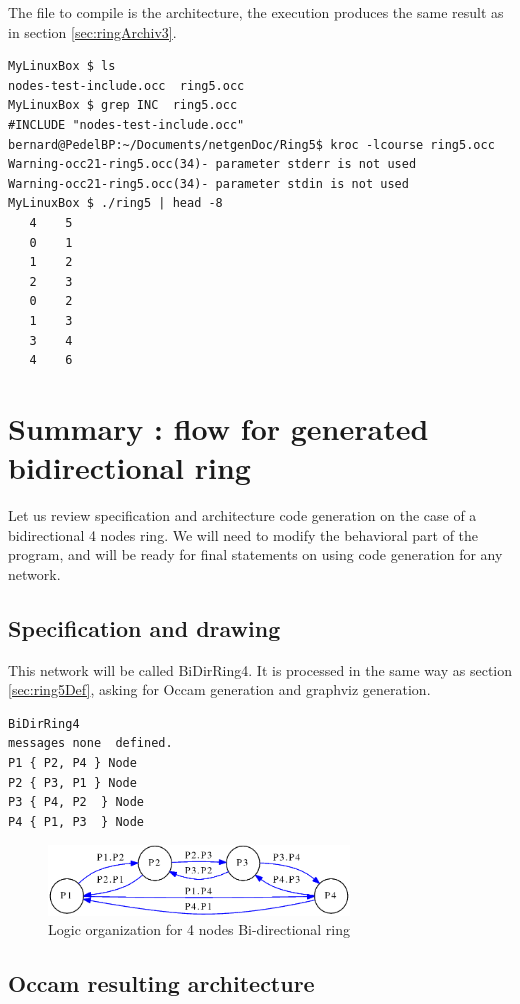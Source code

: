 \documentclass[times,a4paper]{book}
\begin{document}
The file to compile is the architecture, the execution produces the same result as in section 
\ref{sec:ringArchiv3}.

\begin{lstlisting} 
MyLinuxBox $ ls
nodes-test-include.occ  ring5.occ
MyLinuxBox $ grep INC  ring5.occ
#INCLUDE "nodes-test-include.occ"
bernard@PedelBP:~/Documents/netgenDoc/Ring5$ kroc -lcourse ring5.occ
Warning-occ21-ring5.occ(34)- parameter stderr is not used
Warning-occ21-ring5.occ(34)- parameter stdin is not used
MyLinuxBox $ ./ring5 | head -8
   4    5
   0    1
   1    2
   2    3
   0    2
   1    3
   3    4
   4    6
\end{lstlisting} 

\section {Summary : flow for generated bidirectional ring }
Let us review specification and architecture code generation on the case of 
a bidirectional 4 nodes ring. We will need to modify  the behavioral part of the 
program, and will be ready for final statements on using  code generation
for any network.

\subsection {Specification and drawing }

This network will be called BiDirRing4. It is processed in the same way as section \ref{sec:ring5Def},
asking for Occam generation and graphviz generation.

\begin{lstlisting} 
BiDirRing4
messages none  defined. 
P1 { P2, P4 } Node
P2 { P3, P1 } Node 
P3 { P4, P2  } Node  
P4 { P1, P3  } Node  
\end{lstlisting} 


\begin{figure}[hbtp]
\begin{center} 
\includegraphics[width=8cm]{BiDirRing4.png}
\caption{Logic organization for 4 nodes Bi-directional ring}
\label{fig:BiDirRing4}
\end{center}
\end{figure}


\subsection {Occam resulting architecture}
\end{document}
